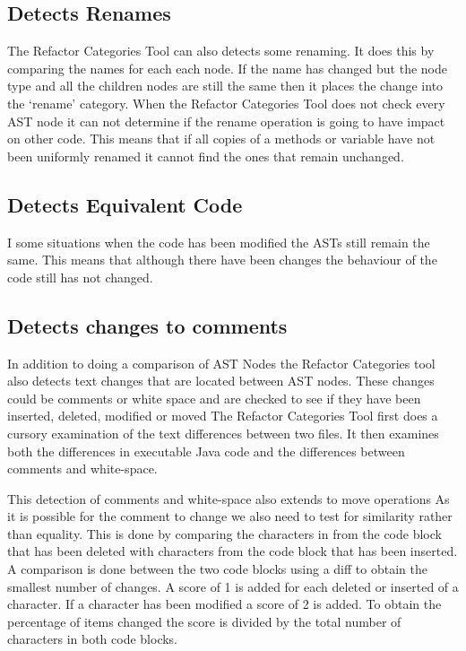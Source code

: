 \subsection{Detects Renames}
The Refactor Categories Tool can also detects some renaming. 
It does this by comparing the names for each each node.
If the name has changed but the node type and all the children nodes are still the same then it places the change into the `rename' category.
When the Refactor Categories Tool does not check every AST node it can not determine if the rename operation is going to have impact on other code.
This means that if all copies of a methods or variable have not been uniformly renamed it cannot find the ones that remain unchanged.

\subsection{Detects Equivalent Code}
I some situations when the code has been modified the ASTs still remain the same.  
This means that although there have been changes the behaviour of the code still has not changed.

\subsection{Detects changes to comments} 
In addition to doing a comparison of AST Nodes the Refactor Categories tool also detects text changes that are located between AST nodes.
These changes could be comments or white space and are checked to see if they have been inserted, deleted, modified or moved
The Refactor Categories Tool first does a cursory examination of the text differences between two files.
It then examines both the differences in executable Java code and the differences between comments and white-space. 

This detection of comments and white-space also extends to move operations 
As it is possible for the comment to change we also need to test for similarity rather than equality.  
This is done by comparing the characters in from the code block that has been deleted with characters from the code block that has been inserted.  
A comparison is done between the two code blocks using a diff to obtain the smallest number of changes. 
A score of 1 is added for each deleted or inserted of a character.
If a character has been modified a score of 2 is added. 
To obtain the percentage of items changed the score is divided by the total number of characters in both code blocks.

